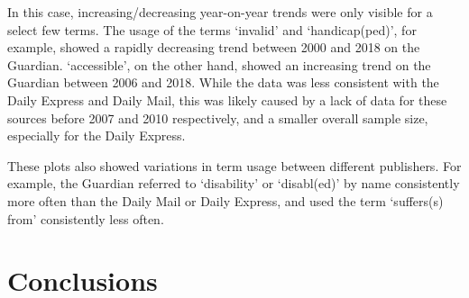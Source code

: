\documentclass{report}
\begin{document}
In this case, increasing/decreasing year-on-year trends were only visible for a select few terms.
The usage of the terms `invalid' and `handicap(ped)', for example, showed a rapidly decreasing trend between 2000 and 2018 on the Guardian.
`accessible', on the other hand, showed an increasing trend on the Guardian between 2006 and 2018.
While the data was less consistent with the Daily Express and Daily Mail, this was likely caused by a lack of data for these sources before 2007 and 2010 respectively, and a smaller overall sample size, especially for the Daily Express.

These plots also showed variations in term usage between different publishers.
For example, the Guardian referred to `disability' or `disabl(ed)' by name consistently more often than the Daily Mail or Daily Express, and used the term `suffers(s) from' consistently less often.






\chapter{Conclusions} \label{Conclusions}  %

\end{document}
